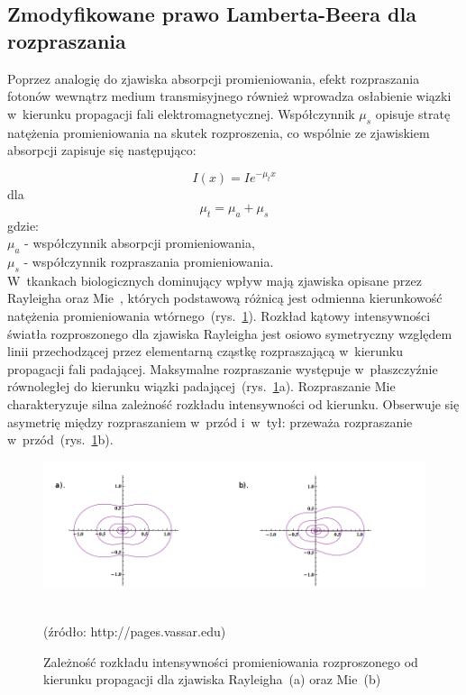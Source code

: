 \subsection{Zmodyfikowane prawo Lamberta-Beera dla rozpraszania}
\label{subsec:LBrozpraszanie} 

Poprzez analogię do zjawiska absorpcji promieniowania, efekt rozpraszania fotonów wewnątrz medium transmisyjnego również wprowadza osłabienie wiązki w~kierunku 
propagacji fali elektromagnetycznej. Współczynnik $\mu_{s}$ opisuje stratę natężenia promieniowania na skutek rozproszenia, co wspólnie ze zjawiskiem absorpcji 
zapisuje się następująco:

\begin{equation}
	I(x) = Ie^{-\mu_{t}x}
\end{equation}
dla
\begin{equation}
	\mu_{t} = \mu_{a} + \mu_{s}
\end{equation}
gdzie:\\
$\mu_{a}$ - współczynnik absorpcji promieniowania,\\
$\mu_{s}$ - współczynnik rozpraszania promieniowania.\\

W~tkankach biologicznych dominujący wpływ mają zjawiska opisane przez Rayleigha oraz Mie~\cite{Nui:2007}, których podstawową różnicą jest odmienna kierunkowość 
natężenia promieniowania wtórnego~(rys.~\ref{rys:scattering_3}). Rozkład kątowy intensywności światła rozproszonego dla zjawiska Rayleigha jest osiowo symetryczny 
względem linii przechodzącej przez elementarną cząstkę rozpraszającą w~kierunku propagacji fali padającej. Maksymalne rozpraszanie występuje w~płaszczyźnie równoległej 
do kierunku wiązki padającej~(rys.~\ref{rys:scattering_3}a). Rozpraszanie Mie charakteryzuje silna zależność rozkładu intensywności od kierunku. Obserwuje się asymetrię 
między rozpraszaniem w~przód i~w~tył: przeważa rozpraszanie w~przód~(rys.~\ref{rys:scattering_3}b).
\begin{figure}[!ht]
	\centerline{\includegraphics[scale = 0.62]{graphic/scattering_3.png}}
	\caption{Zależność rozkładu intensywności promieniowania rozproszonego od kierunku propagacji dla zjawiska Rayleigha~(a) oraz Mie~(b)}
	~\\
	(źródło: http://pages.vassar.edu)
	\label{rys:scattering_3}
\end{figure}

